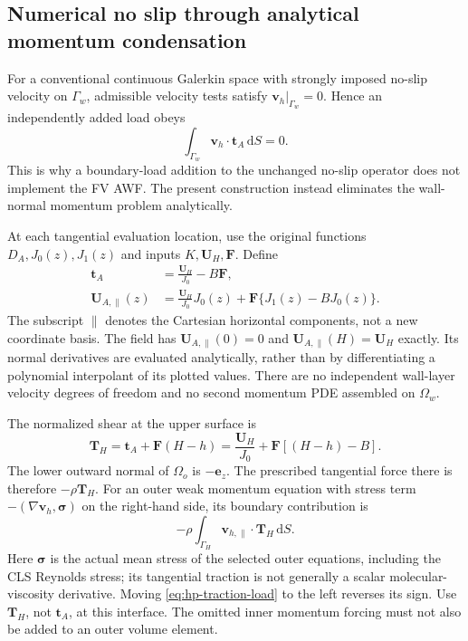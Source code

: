 \documentclass[11pt,a4paper]{article}
\numberwithin{equation}{section}
\newcommand{\dd}{\mathrm{d}}
\begin{document}
\subsection{Numerical no slip through analytical momentum condensation}
\label{sec:hp-momentum}
For a conventional continuous Galerkin space with strongly imposed
no-slip velocity on $\Gamma_w$, admissible velocity tests satisfy
$\bm v_h|_{\Gamma_w}=0$. Hence an independently added load obeys
\begin{equation}
 \int_{\Gamma_w}\bm v_h\cdot\bm t_A\,\dd S=0.
 \label{eq:dirichlet-traction-zero}
\end{equation}
This is why a boundary-load addition to the unchanged no-slip operator
does not implement the FV AWF. The present construction instead
eliminates the wall-normal momentum problem analytically.

At each tangential evaluation location, use the original functions
$D_A,J_0(z),J_1(z)$ and inputs $K,\bm U_H,\bm F$. Define
\begin{align}
 \bm t_A&=\frac{\bm U_H}{J_0}-B\bm F,
 \label{eq:hp-wall-traction}\\
 \bm U_{A,\parallel}(z)
 &=\frac{\bm U_H}{J_0}J_0(z)
   +\bm F\{J_1(z)-BJ_0(z)\}.
 \label{eq:hp-reconstruction}
\end{align}
The subscript $\parallel$ denotes the Cartesian horizontal components,
not a new coordinate basis. The field has
$\bm U_{A,\parallel}(0)=0$ and
$\bm U_{A,\parallel}(H)=\bm U_H$ exactly. Its normal derivatives are
evaluated analytically, rather than by differentiating a polynomial
interpolant of its plotted values. There are no independent wall-layer
velocity degrees of freedom and no second momentum PDE assembled on
$\Omega_w$.

The normalized shear at the upper surface is
\begin{equation}
 \boxed{\bm T_H=\bm t_A+\bm F(H-h)
  =\frac{\bm U_H}{J_0}+\bm F[(H-h)-B].}
 \label{eq:hp-interface-stress}
\end{equation}
The lower outward normal of $\Omega_o$ is $-\bm e_z$. The prescribed
tangential force there is therefore $-\rho\bm T_H$. For an outer weak
momentum equation with stress term
$-(\nabla\bm v_h,\boldsymbol\sigma)$ on the right-hand side, its
boundary contribution is
\begin{equation}
 -\rho\int_{\Gamma_H}\bm v_{h,\parallel}\cdot\bm T_H\,\dd S.
 \label{eq:hp-traction-load}
\end{equation}
Here $\boldsymbol\sigma$ is the actual mean stress of the selected
outer equations, including the CLS Reynolds stress; its tangential
traction is not generally a scalar molecular-viscosity derivative.
Moving \cref{eq:hp-traction-load} to the left reverses its sign.
Use $\bm T_H$, not $\bm t_A$, at this interface. The omitted inner
momentum forcing must not also be added to an outer volume element.
\end{document}
